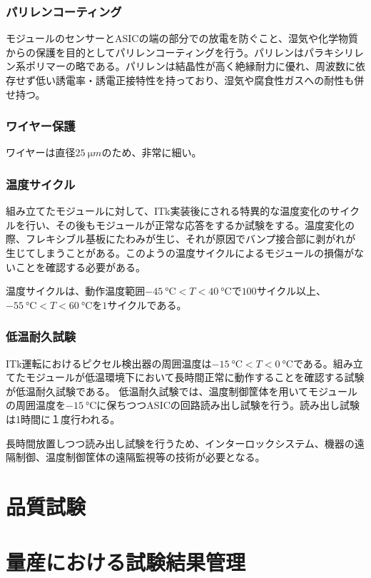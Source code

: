 \subsubsection*{パリレンコーティング}

モジュールのセンサーとASICの端の部分での放電を防ぐこと、湿気や化学物質からの保護を目的としてパリレンコーティングを行う。パリレンはパラキシリレン系ポリマーの略である。パリレンは結晶性が高く絶縁耐力に優れ、周波数に依存せず低い誘電率・誘電正接特性を持っており、湿気や腐食性ガスへの耐性も併せ持つ。


\subsubsection*{ワイヤー保護}

ワイヤーは直径$25\ \si{\micro m}$のため、非常に細い。

\subsubsection*{温度サイクル}

組み立てたモジュールに対して、ITk実装後にされる特異的な温度変化のサイクルを行い、その後もモジュールが正常な応答をするか試験をする。温度変化の際、フレキシブル基板にたわみが生じ、それが原因でバンプ接合部に剥がれが生じてしまうことがある。このようの温度サイクルによるモジュールの損傷がないことを確認する必要がある。

温度サイクルは、動作温度範囲$-45\ \si{\degreeCelsius}<T<40\ \si{\degreeCelsius}$で$100$サイクル以上、$-55\ \si{\degreeCelsius}<T<60\ \si{\degreeCelsius}$を$1$サイクルである。

\subsubsection*{低温耐久試験}

ITk運転におけるピクセル検出器の周囲温度は$-15\ \si{\degreeCelsius}<T<0\ \si{\degreeCelsius}$である。組み立てたモジュールが低温環境下において長時間正常に動作することを確認する試験が低温耐久試験である。
低温耐久試験では、温度制御筐体を用いてモジュールの周囲温度を$-15\ \si{\degreeCelsius}$に保ちつつASICの回路読み出し試験を行う。読み出し試験は1時間に１度行われる。

長時間放置しつつ読み出し試験を行うため、インターロックシステム、機器の遠隔制御、温度制御筐体の遠隔監視等の技術が必要となる。


\section{品質試験}
\label{sec:QCtest}




\subsection{}

\section{量産における試験結果管理}
\label{sec:}



\newpage
